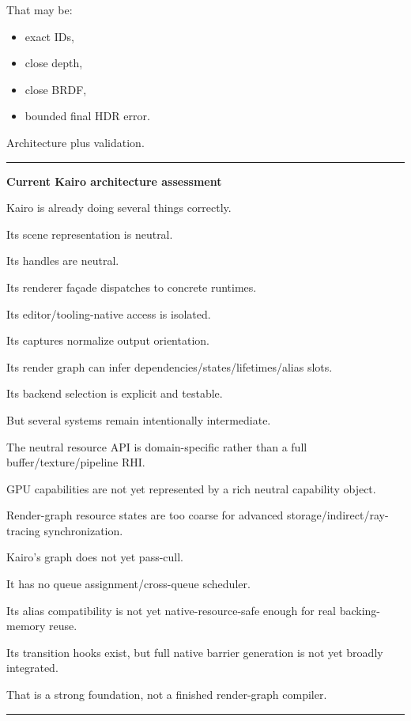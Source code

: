 That may be:

\begin{itemize}
\tightlist
\item
  exact IDs,
\item
  close depth,
\item
  close BRDF,
\item
  bounded final HDR error.
\end{itemize}

Architecture plus validation.

\begin{center}\rule{0.5\linewidth}{0.5pt}\end{center}

\textbf{Current Kairo architecture assessment}

Kairo is already doing several things correctly.

Its scene representation is neutral.

Its handles are neutral.

Its renderer façade dispatches to concrete runtimes.

Its editor/tooling-native access is isolated.

Its captures normalize output orientation.

Its render graph can infer dependencies/states/lifetimes/alias slots.

Its backend selection is explicit and testable.

But several systems remain intentionally intermediate.

The neutral resource API is domain-specific rather than a full buffer/texture/pipeline RHI.

GPU capabilities are not yet represented by a rich neutral capability object.

Render-graph resource states are too coarse for advanced storage/indirect/ray-tracing synchronization.

Kairo's graph does not yet pass-cull.

It has no queue assignment/cross-queue scheduler.

Its alias compatibility is not yet native-resource-safe enough for real backing-memory reuse.

Its transition hooks exist, but full native barrier generation is not yet broadly integrated.

That is a strong foundation, not a finished render-graph compiler.

\begin{center}\rule{0.5\linewidth}{0.5pt}\end{center}

